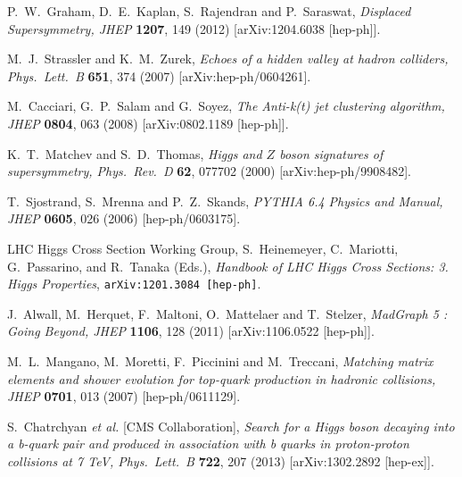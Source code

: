 \documentclass{JHEP3}
\begin{document}
\begin{thebibliography}{99}
  P.~W.~Graham, D.~E.~Kaplan, S.~Rajendran and P.~Saraswat,
  \textit{Displaced Supersymmetry,
  JHEP} {\bf 1207}, 149 (2012)
  [arXiv:1204.6038 [hep-ph]].

  M.~J.~Strassler and K.~M.~Zurek,
  \textit{Echoes of a hidden valley at hadron colliders,
  Phys.\ Lett.\  B} {\bf 651}, 374 (2007)
  [arXiv:hep-ph/0604261].

  M.~Cacciari, G.~P.~Salam and G.~Soyez,
  \textit{The Anti-k(t) jet clustering algorithm,
  JHEP} {\bf 0804}, 063 (2008)
  [arXiv:0802.1189 [hep-ph]].

  K.~T.~Matchev and S.~D.~Thomas,
  \textit{Higgs and $Z$ boson signatures of supersymmetry,
  Phys.\ Rev.\  D} {\bf 62}, 077702 (2000)
  [arXiv:hep-ph/9908482].

  T.~Sjostrand, S.~Mrenna and P.~Z.~Skands,
  \textit{PYTHIA 6.4 Physics and Manual,
  JHEP} {\bf 0605}, 026 (2006)
  [hep-ph/0603175].

     LHC Higgs Cross Section Working Group, S.~Heinemeyer,
     C.~Mariotti, G.~Passarino, and R.~Tanaka (Eds.), 
     {\sl Handbook of LHC Higgs Cross Sections: 3. Higgs Properties}, 
     {\tt arXiv:1201.3084 [hep-ph]}.   

  J.~Alwall, M.~Herquet, F.~Maltoni, O.~Mattelaer and T.~Stelzer,
  \textit{MadGraph 5 : Going Beyond,
  JHEP} {\bf 1106}, 128 (2011)
  [arXiv:1106.0522 [hep-ph]].

  M.~L.~Mangano, M.~Moretti, F.~Piccinini and M.~Treccani,
  \textit{Matching matrix elements and shower evolution for top-quark production in hadronic collisions,
  JHEP} {\bf 0701}, 013 (2007)
  [hep-ph/0611129].

  S.~Chatrchyan {\it et al.}  [CMS Collaboration],
  \textit{Search for a Higgs boson decaying into a b-quark pair and produced in association with b quarks in proton-proton collisions at 7 TeV,
  Phys.\ Lett.\ B} {\bf 722}, 207 (2013)
  [arXiv:1302.2892 [hep-ex]].


\end{thebibliography}
\end{document}
